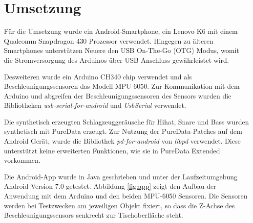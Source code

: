 \section{Umsetzung}
Für die Umsetzung wurde ein Android-Smartphone, ein Lenovo K6 mit einem Qualcomm Snapdragon 430 Prozessor \cite{qualcomm} verwendet.
Hingegen zu älteren Smartphones unterstützen Neuere den USB On-The-Go (OTG) Modus, womit die Stromversorgung des Arduinos über USB-Anschluss gewährleistet wird.

Desweiteren wurde ein Arduino CH340 chip verwendet und als Beschleunigungssensoren das Modell MPU-6050.
Zur Kommunikation mit dem Arduino und abgreifen der Beschleunigungssensoren des Sensors wurden die Bibliotheken \textit{usb-serial-for-android} \cite{mik3y} und \textit{UsbSerial} \cite{felHR85} verwendet.

Die synthetisch erzeugten Schlagzeuggeräusche für Hihat, Snare und Bass wurden synthetisch mit PureData \cite{puredata} erzeugt. 
Zur Nutzung der PureData-Patches auf dem Android Gerät, wurde die Bibliothek \textit{pd-for-android} \cite{pdAndroid} von \textit{libpd} verwendet.
Diese unterstützt keine erweiterten Funktionen, wie sie in PureData Extended vorkommen.

Die Android-App wurde in Java geschrieben und unter der Laufzeitumgebung Android-Version 7.0 getestet.
Abbildung \ref{fig:app} zeigt den Aufbau der Anwendung mit dem Arduino und den beiden MPU-6050 Sensoren.
Die Sensoren werden bei Testzwecken am jeweiligen Objekt fixiert, so dass die Z-Achse des Beschleunigungssensors senkrecht zur Tischoberfläche steht.


